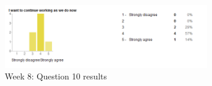 \begin{figure}[h!]
\caption{Week 8: Question 10 results}
\centering
\includegraphics[width=0.8\textwidth]{evaluation/week_8_images/continue_work}
\end{figure}


